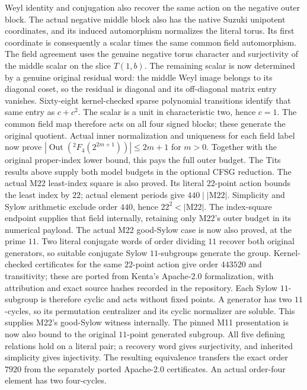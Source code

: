 Weyl identity and conjugation also recover the same action on the
negative outer block. The actual negative middle block also has the
native Suzuki unipotent coordinates, and its induced automorphism
normalizes the literal torus. Its first coordinate is consequently a
scalar times the same common field automorphism. The field agreement
uses the genuine negative torus character and surjectivity of the
middle scalar on the slice $T(1,b)$.
The remaining scalar is now determined by a genuine original residual
word: the middle Weyl image belongs to its diagonal coset, so the
residual is diagonal and its off-diagonal matrix entry vanishes.
Sixty-eight kernel-checked sparse polynomial transitions identify that
same entry as $c+c^2$. The scalar is a unit in characteristic two, hence
$c=1$. The common field map therefore acts on all four signed blocks;
these generate the original quotient. Actual inner normalization and
uniqueness for each field label now prove
$|\operatorname{Out}({}^2F_4(2^{2m+1}))|\leq2m+1$ for $m>0$.
Together with the original proper-index lower bound, this pays the
full outer budget. The Tits results above supply both model budgets
in the optional CFSG reduction.
The actual M22 least-index square is also proved. Its literal 22-point
action bounds the least index by $22$; actual element periods give
$440\mid|\mathrm{M22}|$. Simplicity and Sylow arithmetic exclude order
$440$, hence $22^2<|\mathrm{M22}|$. The index-square endpoint supplies
that field internally, retaining only M22's outer budget in its
numerical payload. The actual M22 good-Sylow case is now also proved,
at the prime $11$. Two literal conjugate words of order dividing $11$
recover both original generators, so suitable conjugate Sylow
$11$-subgroups generate the group. Kernel-checked certificates for the
same $22$-point action give order $443520$ and transitivity; these are
ported from Kenta's Apache-2.0 formalization, with attribution and exact
source hashes recorded in the repository. Each Sylow $11$-subgroup is
therefore cyclic and acts without fixed points. A generator has two
$11$-cycles, so its permutation centralizer and its cyclic normalizer
are soluble. This supplies M22's good-Sylow witness internally.
The pinned M11 presentation is now also bound to the original
$11$-point generated subgroup. All five defining relations hold on a
literal pair; a recovery word gives surjectivity, and inherited
simplicity gives injectivity. The resulting equivalence transfers
the exact order $7920$ from the separately ported Apache-2.0
certificates. An actual order-four element has two four-cycles.
